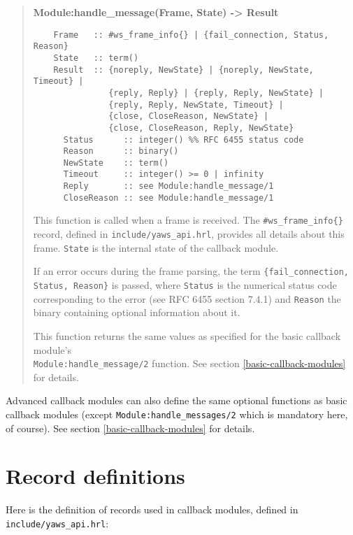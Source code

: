 \documentclass[11pt,oneside,english]{book}
\begin{document}
\begin{quote}
  \textbf{Module:handle\_message(Frame, State) -> Result}
\begin{verbatim}
    Frame   :: #ws_frame_info{} | {fail_connection, Status, Reason}
    State   :: term()
    Result  :: {noreply, NewState} | {noreply, NewState, Timeout} |
               {reply, Reply} | {reply, Reply, NewState} |
               {reply, Reply, NewState, Timeout} |
               {close, CloseReason, NewState} |
               {close, CloseReason, Reply, NewState}
      Status      :: integer() %% RFC 6455 status code
      Reason      :: binary()
      NewState    :: term()
      Timeout     :: integer() >= 0 | infinity
      Reply       :: see Module:handle_message/1
      CloseReason :: see Module:handle_message/1
\end{verbatim}

  This function is called when a frame is received. The
  \verb+#ws_frame_info{}+ record, defined in \verb+include/yaws_api.hrl+,
  provides all details about this frame. \verb+State+ is the internal state
  of the callback module.

  If an error occurs during the frame parsing, the term
  \verb+{fail_connection, Status, Reason}+ is passed, where \verb+Status+ is the
  numerical status code corresponding to the error (see RFC 6455 section 7.4.1)
  and \verb+Reason+ the binary containing optional information about it.

  This function returns the same values as specified for the basic callback
  module's \\ \verb+Module:handle_message/2+ function. See section
  \ref{basic-callback-modules} for details.
\end{quote}

Advanced callback modules can also define the same optional functions as
basic callback modules (except \verb+Module:handle_messages/2+ which is
mandatory here, of course). See section \ref{basic-callback-modules} for
details.


\section{Record definitions}

Here is the definition of records used in callback modules, defined in
\verb+include/yaws_api.hrl+:
\end{document}
